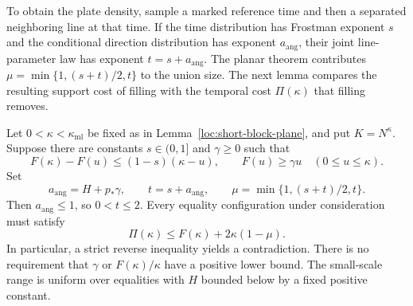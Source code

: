 To obtain the plate density, sample a marked reference time and then
a separated neighboring line at that time.  If the time distribution
has Frostman exponent $s$ and the conditional direction distribution
has exponent $a_{\mathrm{ang}}$, their joint line-parameter law has
exponent $t=s+a_{\mathrm{ang}}$.  The planar theorem contributes
$\mu=\min\{1,(s+t)/2,t\}$ to the union size.  The next lemma
compares the resulting support cost of filling with the temporal
cost $\Pi(\kappa)$ that filling removes.

\begin{lemma}
\label{lem:prefix-extension}
Let $0<\kappa<\kappa_{\mathrm{ml}}$ be fixed as in
Lemma~\ref{loc:short-block-plane}, and put $K=N^\kappa$.  Suppose
there are constants $s\in(0,1]$ and $\gamma\geq0$ such that
\begin{equation}
 F(\kappa)-F(u)\leq(1-s)(\kappa-u),
 \qquad F(u)\geq\gamma u
 \quad(0\leq u\leq\kappa).
 \label{loc:prefix-assumptions}
\end{equation}
Set
\begin{equation}
 a_{\mathrm{ang}}=H+p_*\gamma,
 \qquad t=s+a_{\mathrm{ang}},
 \qquad \mu=\min\{1,(s+t)/2,t\}.
 \label{loc:prefix-exponents}
\end{equation}
Then $a_{\mathrm{ang}}\leq1$, so $0<t\leq2$.  Every equality
configuration under consideration must satisfy
\begin{equation}
 \Pi(\kappa)\leq F(\kappa)+2\kappa(1-\mu).
 \label{loc:prefix-necessary}
\end{equation}
In particular, a strict reverse inequality yields a contradiction.
There is no requirement that $\gamma$ or $F(\kappa)/\kappa$ have a
positive lower bound.  The small-scale range is uniform over
equalities with $H$ bounded below by a fixed positive constant.
\end{lemma}

